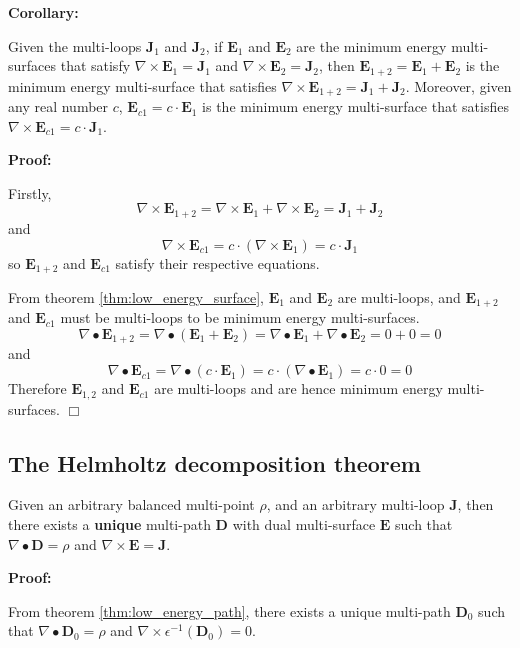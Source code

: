 \textbf{Corollary:}

Given the multi-loops \(\mathbf{J}_1\) and \(\mathbf{J}_2\), if \(\mathbf{E}_1\) and \(\mathbf{E}_2\) are the minimum energy multi-surfaces that satisfy \(\nabla \times \mathbf{E}_1 = \mathbf{J}_1\) and \(\nabla \times \mathbf{E}_2 = \mathbf{J}_2\), then \(\mathbf{E}_{1+2} = \mathbf{E}_1 + \mathbf{E}_2\) is the minimum energy multi-surface that satisfies \(\nabla \times \mathbf{E}_{1+2} = \mathbf{J}_1 + \mathbf{J}_2\). Moreover, given any real number \(c\), \(\mathbf{E}_{c1} = c \cdot \mathbf{E}_1\) is the minimum energy multi-surface that satisfies \(\nabla \times \mathbf{E}_{c1} = c \cdot \mathbf{J}_1\).

\textbf{Proof:}

Firstly, 
\[\nabla \times \mathbf{E}_{1+2} = \nabla \times \mathbf{E}_1 + \nabla \times \mathbf{E}_2 = \mathbf{J}_1 + \mathbf{J}_2\]
and
\[\nabla \times \mathbf{E}_{c1} = c \cdot (\nabla \times \mathbf{E}_1) = c \cdot \mathbf{J}_1\]
so \(\mathbf{E}_{1+2}\) and \(\mathbf{E}_{c1}\) satisfy their respective equations.

From theorem \ref{thm:low_energy_surface}, \(\mathbf{E}_1\) and \(\mathbf{E}_2\) are multi-loops, and \(\mathbf{E}_{1+2}\) and \(\mathbf{E}_{c1}\) must be multi-loops to be minimum energy multi-surfaces. 
\[\nabla \bullet \mathbf{E}_{1+2} = \nabla \bullet (\mathbf{E}_1 + \mathbf{E}_2) = \nabla \bullet \mathbf{E}_1 + \nabla \bullet \mathbf{E}_2 = 0 + 0 = 0\]
and
\[\nabla \bullet \mathbf{E}_{c1} = \nabla \bullet (c \cdot \mathbf{E}_1) = c \cdot (\nabla \bullet \mathbf{E}_1) = c \cdot 0 = 0\]
Therefore \(\mathbf{E}_{1,2}\) and \(\mathbf{E}_{c1}\) are multi-loops and are hence minimum energy multi-surfaces. \(\Box\)



\subsection{The Helmholtz decomposition theorem}

\begin{thm}\label{thm:exactly_one_solution}   
Given an arbitrary balanced multi-point \(\rho\), and an arbitrary multi-loop \(\mathbf{J}\), then there exists a {\bf unique} multi-path \(\mathbf{D}\) with dual multi-surface \(\mathbf{E}\) such that \(\nabla \bullet \mathbf{D} = \rho\) and \(\nabla \times \mathbf{E} = \mathbf{J}\).
\end{thm}
\textbf{Proof:}

From theorem \ref{thm:low_energy_path}, there exists a unique multi-path \(\mathbf{D}_0\) such that \(\nabla \bullet \mathbf{D}_0 = \rho\) and \(\nabla \times \epsilon^{-1}(\mathbf{D}_0) = 0\). 

